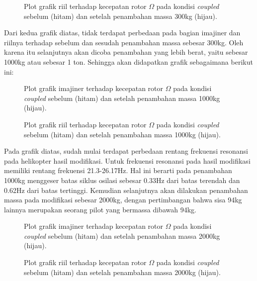 \begin{figure}[H]
	\centering
	\caption{Plot grafik riil terhadap kecepatan rotor $\Omega$ pada kondisi \textit{coupled} sebelum (hitam) dan setelah penambahan massa 300kg (hijau).}
	\label{fig:real(modified)_1}
\end{figure}

Dari kedua grafik diatas, tidak terdapat perbedaan pada bagian imajiner dan riilnya terhadap sebelum dan sesudah penambahan massa sebesar 300kg. Oleh karena itu selanjutnya akan dicoba penambahan yang lebih berat, yaitu sebesar 1000kg atau sebesar 1 ton. Sehingga akan didapatkan grafik sebagaimana berikut ini:

\begin{figure}[H]
	\centering
	\caption{Plot grafik imajiner terhadap kecepatan rotor $\Omega$ pada kondisi \textit{coupled} sebelum (hitam) dan setelah penambahan massa 1000kg (hijau).}
	\label{fig:imag(modified)_2}
\end{figure}

\begin{figure}[H]
	\centering
	\caption{Plot grafik riil terhadap kecepatan rotor $\Omega$ pada kondisi \textit{coupled} sebelum (hitam) dan setelah penambahan massa 1000kg (hijau).}
	\label{fig:real(modified)_2}
\end{figure}

Pada grafik diatas, sudah mulai terdapat perbedaan rentang frekuensi resonansi pada helikopter hasil modifikasi. Untuk frekuensi resonansi pada hasil modifikasi memiliki rentang frekuensi 21.3-26.17Hz. Hal ini berarti pada penambahan 1000kg menggeser batas siklus osilasi sebesar 0.33Hz dari batas terendah dan 0.62Hz dari batas tertinggi. Kemudian selanjutnya akan dilakukan penambahan massa pada modifikasi sebesar 2000kg, dengan pertimbangan bahwa sisa 94kg lainnya merupakan seorang pilot yang bermassa dibawah 94kg. 

\begin{figure}[H]
	\centering
	\caption{Plot grafik imajiner terhadap kecepatan rotor $\Omega$ pada kondisi \textit{coupled} sebelum (hitam) dan setelah penambahan massa 2000kg (hijau).}
	\label{fig:imag(modified)_3}
\end{figure}

\begin{figure}[H]
	\centering
	\caption{Plot grafik riil terhadap kecepatan rotor $\Omega$ pada kondisi \textit{coupled} sebelum (hitam) dan setelah penambahan massa 2000kg (hijau).}
	\label{fig:real(modified)_3}
\end{figure}

